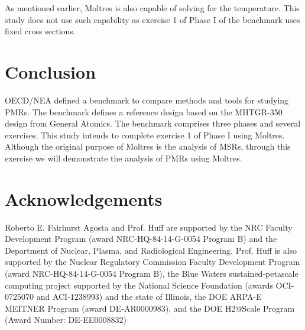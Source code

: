 \documentclass{anstrans}
\begin{document}
As mentioned earlier, Moltres is also capable of solving for the temperature.
This study does not use such capability as exercise 1 of Phase I of the benchmark uses fixed cross sections.

\section{Conclusion}

OECD/NEA defined a benchmark to compare methods and tools for studying \glspl{PMR}.
The benchmark defines a reference design based on the MHTGR-350 design from General Atomics.
The benchmark comprises three phases and several exercises.
This study intends to complete exercise 1 of Phase I using Moltres.
Although the original purpose of Moltres is the analysis of \glspl{MSR}, through this exercise we will demonstrate the analysis of \glspl{PMR} using Moltres.

\section{Acknowledgements}

Roberto E. Fairhurst Agosta and Prof. Huff are supported by the \gls{NRC} Faculty Development Program (award NRC-HQ-84-14-G-0054 Program B) and the Department of Nuclear, Plasma, and Radiological Engineering.
Prof. Huff is also supported by the Nuclear Regulatory Commission Faculty Development Program (award NRC-HQ-84-14-G-0054 Program B), the Blue Waters sustained-petascale computing project supported by the National Science Foundation (awards OCI-0725070 and ACI-1238993) and the state of Illinois, the DOE ARPA-E MEITNER Program (award DE-AR0000983), and the DOE H2@Scale Program (Award Number: DE-EE0008832)



\end{document}
